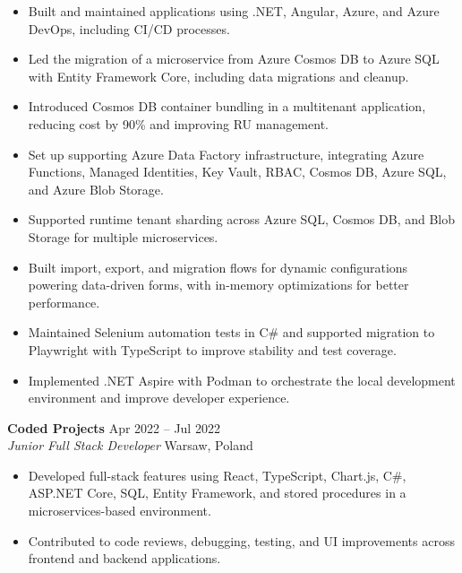 \documentclass[a4paper,10pt]{article}
\newcommand{\resumeSubheading}[4]{
  \textbf{#1} \hfill #2 \\
  \textit{#3} \hfill #4 \\
}
\begin{document}
\begin{itemize}
  \item Built and maintained applications using .NET, Angular, Azure, and
        Azure DevOps, including CI/CD processes.
  \item Led the migration of a microservice from Azure Cosmos DB
        to Azure SQL with Entity Framework Core, including data migrations
        and cleanup.
  \item Introduced Cosmos DB container bundling in a multitenant
        application, reducing cost by 90\% and improving RU management.
  \item Set up supporting Azure Data Factory infrastructure, integrating
        Azure Functions, Managed Identities, Key Vault, RBAC, Cosmos DB,
        Azure SQL, and Azure Blob Storage.
  \item Supported runtime tenant sharding across Azure SQL, Cosmos DB, and
        Blob Storage for multiple microservices.
  \item Built import, export, and migration flows for dynamic
        configurations powering data-driven forms, with in-memory
        optimizations for better performance.
  \item Maintained Selenium automation tests in C\# and supported migration
        to Playwright with TypeScript to improve stability and test
        coverage.
  \item Implemented .NET Aspire with Podman to orchestrate the local
        development environment and improve developer experience.
\end{itemize}

\vspace{4pt}

\resumeSubheading
  {Coded Projects}
  {Apr 2022 -- Jul 2022}
  {Junior Full Stack Developer}
  {Warsaw, Poland}
  \vspace{-10pt}

\begin{itemize}
  \item Developed full-stack features using React, TypeScript, Chart.js,
        C\#, ASP.NET Core, SQL, Entity Framework, and stored procedures in
        a microservices-based environment.
  \item Contributed to code reviews, debugging, testing, and UI
        improvements across frontend and backend applications.
\end{itemize}

\vspace{4pt}
\end{document}
